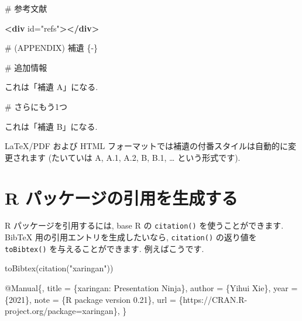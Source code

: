 \documentclass[
  11pt,
  lualatex,
  ja=standard]{bxjsreport}
\newenvironment{Shaded}{\begin{snugshade}}{\end{snugshade}}
\newcommand{\DataTypeTok}[1]{\textcolor[rgb]{0.13,0.29,0.53}{#1}}
\newcommand{\FunctionTok}[1]{\textcolor[rgb]{0.00,0.00,0.00}{#1}}
\newcommand{\KeywordTok}[1]{\textcolor[rgb]{0.13,0.29,0.53}{\textbf{#1}}}
\newcommand{\NormalTok}[1]{#1}
\newcommand{\OtherTok}[1]{\textcolor[rgb]{0.56,0.35,0.01}{#1}}
\newcommand{\StringTok}[1]{\textcolor[rgb]{0.31,0.60,0.02}{#1}}
\newcommand{\VariableTok}[1]{\textcolor[rgb]{0.00,0.00,0.00}{#1}}
\begin{document}
\begin{Shaded}
\begin{Highlighting}[]
\FunctionTok{\# 参考文献}

\KeywordTok{\textless{}div}\OtherTok{ id=}\StringTok{"refs"}\KeywordTok{\textgreater{}\textless{}/div\textgreater{}}

\FunctionTok{\# (APPENDIX) 補遺 \{{-}\} }

\FunctionTok{\# 追加情報}

\NormalTok{これは「補遺 A」になる.}

\FunctionTok{\# さらにもう1つ}

\NormalTok{これは「補遺 B」になる.}
\end{Highlighting}
\end{Shaded}

LaTeX/PDF および HTML フォーマットでは補遺の付番スタイルは自動的に変更されます (たいていは A, A.1, A.2, B, B.1, \ldots{} という形式です).

\hypertarget{write-bib}{%
\section{R パッケージの引用を生成する}\label{write-bib}}

R パッケージを引用するには, base R の \texttt{citation()} を使うことができます. BibTeX 用の引用エントリを生成したいなら, \texttt{citation()} の返り値を \texttt{toBibtex()} を与えることができます. 例えばこうです.

\begin{Shaded}
\begin{Highlighting}[numbers=left,,]
\FunctionTok{toBibtex}\NormalTok{(}\FunctionTok{citation}\NormalTok{(}\StringTok{"xaringan"}\NormalTok{))}
\end{Highlighting}
\end{Shaded}

\begin{Shaded}
\begin{Highlighting}[]
\VariableTok{@Manual}\NormalTok{\{,}
  \DataTypeTok{title}\NormalTok{ = \{xaringan: Presentation Ninja\},}
  \DataTypeTok{author}\NormalTok{ = \{Yihui Xie\},}
  \DataTypeTok{year}\NormalTok{ = \{2021\},}
  \DataTypeTok{note}\NormalTok{ = \{R package version 0.21\},}
  \DataTypeTok{url}\NormalTok{ = \{https://CRAN.R{-}project.org/package=xaringan\},}
\NormalTok{\}}
\end{Highlighting}
\end{Shaded}
\end{document}
